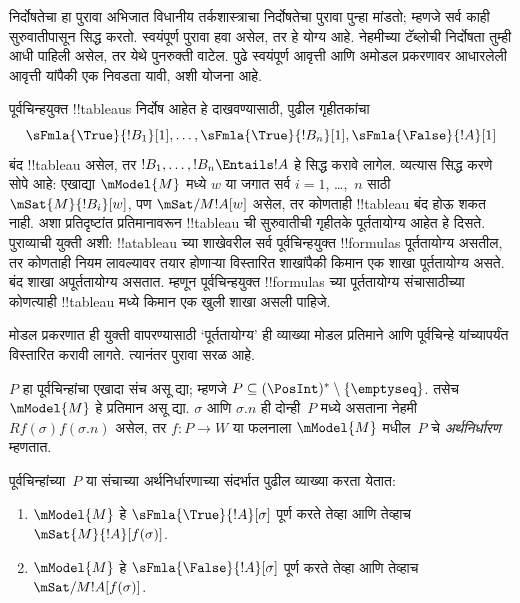 \documentclass[../../../include/open-logic-section]{subfiles}
\begin{document}


\begin{editorial}
  निर्दोषतेचा हा पुरावा अभिजात विधानीय तर्कशास्त्राचा
  निर्दोषतेचा पुरावा पुन्हा मांडतो; म्हणजे सर्व काही
  सुरुवातीपासून सिद्ध करतो. स्वयंपूर्ण पुरावा हवा
  असेल, तर हे योग्य आहे. नेहमीच्या टॅब्लोची निर्दोषता
  तुम्ही आधी पाहिली असेल, तर येथे पुनरुक्ती वाटेल.
  पुढे स्वयंपूर्ण आवृत्ती आणि अमोडल प्रकरणावर आधारलेली
  आवृत्ती यांपैकी एक निवडता यावी, अशी योजना आहे.
\end{editorial}

\begin{explain}
  पूर्वचिन्हयुक्त !!{tableau}s निर्दोष आहेत हे
  दाखवण्यासाठी, पुढील गृहीतकांचा
  \[
  \sFmla{\True}{!B_1}[1], \dots, \sFmla{\True}{!B_n}[1], \sFmla{\False}{!A}[1]
  \]
  बंद !!{tableau} असेल, तर $!B_1, \dots, !B_n
  \Entails !A$ हे सिद्ध करावे लागेल. व्यत्यास सिद्ध
  करणे सोपे आहे: एखाद्या $\mModel{M}$ मध्ये
  $w$ या जगात सर्व $i=1$, \dots,~$n$ साठी
  $\mSat{M}{!B_i}[w]$, पण $\mSat/{M}{!A}[w]$
  असेल, तर कोणताही !!{tableau} बंद होऊ शकत नाही.
  अशा प्रतिदृष्टांत प्रतिमानावरून !!{tableau} ची सुरुवातीची
  गृहीतके पूर्ततायोग्य आहेत हे दिसते. पुराव्याची युक्ती
  अशी: !!a{tableau} च्या शाखेवरील सर्व
  पूर्वचिन्हयुक्त !!{formula}s पूर्ततायोग्य असतील, तर
  कोणताही नियम लावल्यावर तयार होणाऱ्या विस्तारित
  शाखांपैकी किमान एक शाखा पूर्ततायोग्य असते. बंद शाखा
  अपूर्ततायोग्य असतात. म्हणून पूर्वचिन्हयुक्त !!{formula}s
  च्या पूर्ततायोग्य संचासाठीच्या कोणत्याही !!{tableau}
  मध्ये किमान एक खुली शाखा असली पाहिजे.

  मोडल प्रकरणात ही युक्ती वापरण्यासाठी ‘पूर्ततायोग्य’
  ही व्याख्या मोडल प्रतिमाने आणि पूर्वचिन्हे यांच्यापर्यंत
  विस्तारित करावी लागते. त्यानंतर पुरावा सरळ आहे.
\end{explain}

\begin{defn}
  $P$ हा पूर्वचिन्हांचा एखादा संच असू द्या; म्हणजे
  $P \subseteq (\PosInt)^* \setminus
  \{\emptyseq\}$. तसेच $\mModel{M}$ हे प्रतिमान असू द्या.
  $\sigma$ आणि $\sigma.n$ ही दोन्ही~$P$ मध्ये असताना
  नेहमी $Rf(\sigma)f(\sigma.n)$ असेल, तर
  $f\colon P \to W$ या फलनाला $\mModel{M}$
  मधील~$P$ चे \emph{अर्थनिर्धारण} म्हणतात.

  पूर्वचिन्हांच्या~$P$ या संचाच्या अर्थनिर्धारणाच्या
  संदर्भात पुढील व्याख्या करता येतात:
  \begin{enumerate}
  \item $\mModel{M}$ हे $\sFmla{\True}{!A}[\sigma]$
    पूर्ण करते तेव्हा आणि तेव्हाच
    $\mSat{M}{!A}[f(\sigma)]$.
  \item $\mModel{M}$ हे $\sFmla{\False}{!A}[\sigma]$
    पूर्ण करते तेव्हा आणि तेव्हाच
    $\mSat/{M}{!A}[f(\sigma)]$.
  \end{enumerate}
\end{defn}
\end{document}
